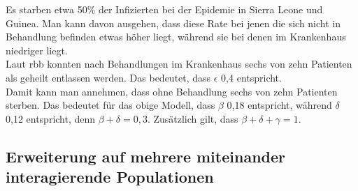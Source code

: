 Es starben etwa 50\% der Infizierten bei der Epidemie in Sierra Leone und Guinea. Man kann davon ausgehen, dass diese Rate bei jenen die sich nicht in Behandlung befinden etwas höher liegt, während sie bei denen im Krankenhaus niedriger liegt.\\
Laut rbb konnten nach Behandlungen im Krankenhaus sechs von zehn Patienten als geheilt entlassen werden. Das bedeutet, dass $\epsilon$ 0,4 entspricht. \\
Damit kann man annehmen, dass ohne Behandlung sechs von zehn Patienten sterben. Das bedeutet für das obige Modell, dass $\beta$ 0,18 entspricht, während $\delta$ 0,12 entspricht, denn $\beta + \delta = 0,3$. Zusätzlich gilt, dass $\beta + \delta + \gamma = 1$. \\
\subsection{Erweiterung auf mehrere miteinander interagierende Populationen}\label{ssec:multiPop}
\steffen
